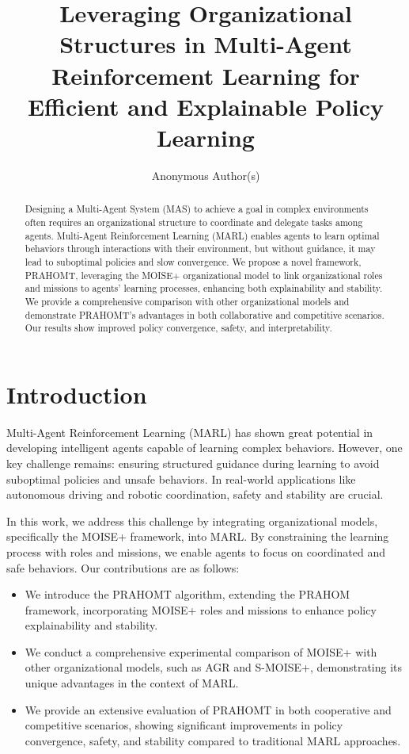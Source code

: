 \documentclass{article}
\title{Leveraging Organizational Structures in Multi-Agent Reinforcement Learning for Efficient and Explainable Policy Learning}
\author{Anonymous Author(s)}
\begin{document}
\maketitle

\begin{abstract}
Designing a Multi-Agent System (MAS) to achieve a goal in complex environments often requires an organizational structure to coordinate and delegate tasks among agents. Multi-Agent Reinforcement Learning (MARL) enables agents to learn optimal behaviors through interactions with their environment, but without guidance, it may lead to suboptimal policies and slow convergence. We propose a novel framework, PRAHOMT, leveraging the MOISE+ organizational model to link organizational roles and missions to agents' learning processes, enhancing both explainability and stability. We provide a comprehensive comparison with other organizational models and demonstrate PRAHOMT’s advantages in both collaborative and competitive scenarios. Our results show improved policy convergence, safety, and interpretability.
\end{abstract}

\section{Introduction}
\label{sec:introduction}
Multi-Agent Reinforcement Learning (MARL) has shown great potential in developing intelligent agents capable of learning complex behaviors. However, one key challenge remains: ensuring structured guidance during learning to avoid suboptimal policies and unsafe behaviors. In real-world applications like autonomous driving and robotic coordination, safety and stability are crucial.

In this work, we address this challenge by integrating organizational models, specifically the MOISE+ framework, into MARL. By constraining the learning process with roles and missions, we enable agents to focus on coordinated and safe behaviors. Our contributions are as follows:
\begin{itemize}
    \item We introduce the PRAHOMT algorithm, extending the PRAHOM framework, incorporating MOISE+ roles and missions to enhance policy explainability and stability.
    \item We conduct a comprehensive experimental comparison of MOISE+ with other organizational models, such as AGR and S-MOISE+, demonstrating its unique advantages in the context of MARL.
    \item We provide an extensive evaluation of PRAHOMT in both cooperative and competitive scenarios, showing significant improvements in policy convergence, safety, and stability compared to traditional MARL approaches.
\end{itemize}
\end{document}
